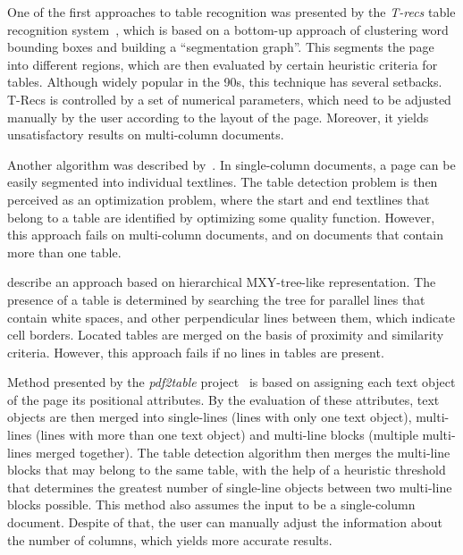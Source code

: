 One of the first approaches to table recognition was presented by the \emph{T-recs} table recognition system~\cite{TRecs}, which is based on a bottom-up approach of clustering word bounding boxes and building a ``segmentation graph''. This segments the page into different regions, which are then evaluated by certain heuristic criteria for tables. Although widely popular in the 90s, this technique has several setbacks. T-Recs is controlled by a set of numerical parameters, which need to be adjusted manually by the user according to the layout of the page. Moreover, it yields unsatisfactory results on multi-column documents.

Another algorithm was described by~\citet{MediumTable}. In single-column documents, a page can be easily segmented into individual textlines. The table detection problem is then perceived as an optimization problem, where the start and end textlines that belong to a table are identified by optimizing some quality function. However, this approach fails on multi-column documents, and on documents that contain more than one table.

\citet{tableDetectCesarini} describe an approach based on hierarchical MXY-tree-like representation. The presence of a table is determined by searching the tree for parallel lines that contain white spaces, and other perpendicular lines between them, which indicate cell borders. Located tables are merged on the basis of proximity and similarity criteria. However, this approach fails if no lines in tables are present.

Method presented by the \emph{pdf2table} project~\cite{pdf2table} is based on assigning each text object of the page its positional attributes. By the evaluation of these attributes, text objects are then merged into single-lines (lines with only one text object), multi-lines (lines with more than one text object) and multi-line blocks (multiple multi-lines merged together). The table detection algorithm then merges the multi-line blocks that may belong to the same table, with the help of a heuristic threshold that determines the greatest number of single-line objects between two multi-line blocks possible. This method also assumes the input to be a single-column document. Despite of that, the user can manually adjust the information about the number of columns, which yields more accurate results.